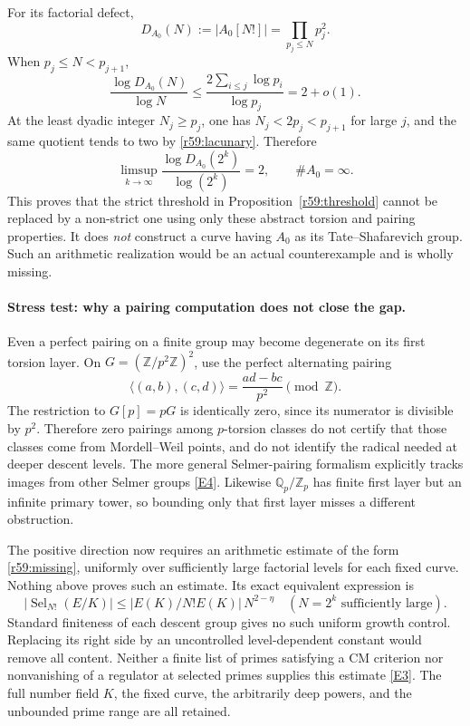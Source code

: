 \documentclass[11pt,a4paper]{article}
\newcommand{\Z}{\mathbb{Z}}
\newcommand{\Q}{\mathbb{Q}}
\newcommand{\eref}[2]{\hyperlink{extra:#1:#2}{[E#2]}}
\numberwithin{equation}{section}
\begin{document}
For its factorial defect,
\begin{equation}\label{r59:toydefect}
 D_{A_0}(N):=|A_0[N!]|=\prod_{p_j\leq N}p_j^2.
\end{equation}
When $p_j\leq N<p_{j+1}$,
\[
 \frac{\log D_{A_0}(N)}{\log N}
 \leq\frac{2\sum_{i\leq j}\log p_i}{\log p_j}=2+o(1).
\]
At the least dyadic integer $N_j\geq p_j$, one has $N_j<2p_j<p_{j+1}$ for large $j$, and the same quotient tends to two by \eqref{r59:lacunary}. Therefore
\begin{equation}\label{r59:sharp}
 \limsup_{k\to\infty}\frac{\log D_{A_0}(2^k)}{\log(2^k)}=2,
 \qquad \#A_0=\infty.
\end{equation}
This proves that the strict threshold in Proposition~\ref{r59:threshold} cannot be replaced by a non-strict one using only these abstract torsion and pairing properties. It does \emph{not} construct a curve having $A_0$ as its Tate--Shafarevich group. Such an arithmetic realization would be an actual counterexample and is wholly missing.

\paragraph{Stress test: why a pairing computation does not close the gap.}
Even a perfect pairing on a finite group may become degenerate on its first torsion layer. On $G=(\Z/p^2\Z)^2$, use the perfect alternating pairing
\[
 \langle(a,b),(c,d)\rangle=\frac{ad-bc}{p^2}\pmod\Z.
\]
The restriction to $G[p]=pG$ is identically zero, since its numerator is divisible by $p^2$. Therefore zero pairings among $p$-torsion classes do not certify that those classes come from Mordell--Weil points, and do not identify the radical needed at deeper descent levels. The more general Selmer-pairing formalism explicitly tracks images from other Selmer groups \eref{30006701}{4}. Likewise $\Q_p/\Z_p$ has finite first layer but an infinite primary tower, so bounding only that first layer misses a different obstruction.

The positive direction now requires an arithmetic estimate of the form \eqref{r59:missing}, uniformly over sufficiently large factorial levels for each fixed curve. Nothing above proves such an estimate. Its exact equivalent expression is
\[
 |\operatorname{Sel}_{N!}(E/K)|
       \leq |E(K)/N!E(K)|\,N^{2-\eta}
                 \quad(N=2^k\text{ sufficiently large}).
\]
Standard finiteness of each descent group gives no such uniform growth control. Replacing its right side by an uncontrolled level-dependent constant would remove all content. Neither a finite list of primes satisfying a CM criterion nor nonvanishing of a regulator at selected primes supplies this estimate \eref{30006701}{3}. The full number field $K$, the fixed curve, the arbitrarily deep powers, and the unbounded prime range are all retained.
\end{document}
